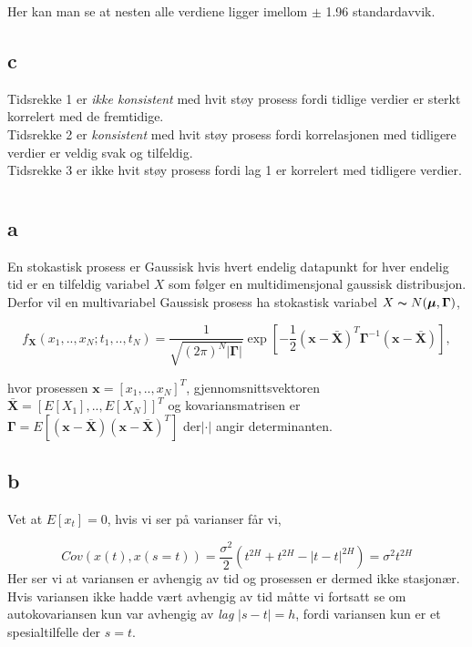 \documentclass[10pt]{article}
\newcommand{\vect}[1]{\boldsymbol{#1}}
\begin{document}
{Her kan man se at nesten alle verdiene ligger imellom $\pm$ 1.96 standardavvik.



\subsection{c}
Tidsrekke 1 er \emph{ikke konsistent} med hvit støy prosess fordi tidlige verdier er sterkt korrelert med de fremtidige.
\\
Tidsrekke 2 er \emph{konsistent} med hvit støy prosess fordi korrelasjonen med tidligere verdier er veldig svak og tilfeldig.
\\
Tidsrekke 3 er ikke hvit støy prosess fordi lag 1 er korrelert med tidligere verdier.


\section{}
\subsection{a}

En stokastisk prosess er Gaussisk hvis hvert endelig datapunkt for hver endelig tid er en tilfeldig variabel $X$ som følger en multidimensjonal gaussisk distribusjon. Derfor vil en multivariabel Gaussisk prosess ha stokastisk variabel $X \thicksim N(\vect{\mu},\vect{\Gamma})$,

\begin{equation}
  f_{\vect{X}}(x_{1},..,x_{N};t_{1},..,t_{N}) = \frac{1}{\sqrt{(2\pi)^{N} |\vect{\Gamma}|}}\exp\left[-\frac{1}{2}(\vect{x} - \vect{\bar{X}})^{T}\vect{\Gamma}^{-1}(\vect{x} - \vect{\bar{X}})  \right],
\end{equation}

hvor prosessen $\vect{x} = [x_{1},..,x_{N}]^{T}$, gjennomsnittsvektoren$\vect{\bar{X}} = [E[X_{1}],..,E[X_{N}]]^{T}$ og kovariansmatrisen er $\vect{\Gamma} = E[(\vect{x} - \vect{\bar{X}})(\vect{x} - \vect{\bar{X}})^{T}]$ der$|\cdot|$ angir determinanten.


\subsection{b}
Vet at $E[x_{t}] = 0$, hvis vi ser på varianser får vi,

\begin{equation*}
  Cov(x(t),x(s=t)) = \frac{\sigma^2}{2}(t^{2H} + t^{2H} - |t - t|^{2H}) = \sigma^2t^{2H}
\end{equation*}
Her ser vi at variansen er avhengig av tid og prosessen er dermed ikke stasjonær. Hvis variansen ikke hadde vært avhengig av tid måtte vi fortsatt se om autokovariansen kun var avhengig av \emph{lag} $|s - t| = h$, fordi variansen kun er et spesialtilfelle der $s = t$.



}
\end{document}
